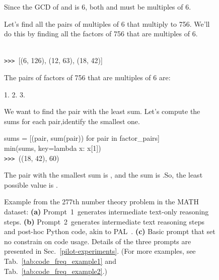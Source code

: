 \documentclass{article} \usepackage{iclr2023_conference,times}
\newcommand{\cmark}{\ding{51}}\newcommand{\xmark}{\ding{55}}
\begin{document}
\begin{figure}[t]
\begin{minipage}{0.37\textwidth}
\begin{tcolorbox}[colback=green!5!white,colframe=green!75!black,title=\large(c)~\normalsize Model output,
    left=1mm,  right=1mm, top=1mm,   bottom=1mm ]
\begin{tiny}
Since the GCD of  and  is 6, both  and  must be multiples of 6.

Let's find all the pairs of multiples of 6 that multiply to 756. We'll do this by finding all the factors of 756 that are multiples of 6.

\begin{tcolorbox}[colback=black!5!white,colframe=black!75!black,title=code,
    left=1mm,  right=1mm, top=1mm,   bottom=1mm ]
[(i, m\_times\_n // i) for i in range(6, int(m\_times\_n**0.5) + 1, 6) if m\_times\_n \% i == 0]\\
\texttt{>>> }[(6, 126), (12, 63), (18, 42)]
\end{tcolorbox}
The pairs of factors of 756 that are multiples of 6 are:

1. 
2. 
3. 

We want to find the pair with the least sum. Let's compute the sums for each pair,identify the smallest one.
\begin{tcolorbox}[colback=black!5!white,colframe=black!75!black,title=code,
    left=1mm,  right=1mm, top=1mm,   bottom=1mm ]
sums = [(pair, sum(pair)) for pair in factor\_pairs]\\
min(sums, key=lambda x: x[1])\\
\texttt{>>> }((18, 42), 60)

\end{tcolorbox}
The pair with the smallest sum is , and the sum is .So, the least possible value is .
\Large \textcolor{teal}{\cmark}
\end{tiny}
\end{tcolorbox}
\end{minipage}



\setlength{\columnsep}{\oldcolumnsep}
\caption{Example from the 277th number theory problem in the MATH dataset: \textbf{(a)} Prompt~1~generates intermediate text-only reasoning steps. \textbf{(b)} Prompt~2~generates intermediate text reasoning steps and post-hoc Python code, akin to PAL~\citep{gao2023pal}. \textbf{(c)} Basic prompt that set no constrain on code usage. Details of the three prompts are presented in Sec.~\ref{pilot-experiments}. (For more examples, see Tab.~\ref{tab:code_freq_example1} and Tab.~\ref{tab:code_freq_example2}.) 
} 
\label{fig:example1}
\end{figure}
\end{document}
